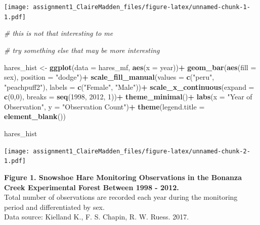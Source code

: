 \documentclass[]{article}
\newenvironment{Shaded}{\begin{snugshade}}{\end{snugshade}}
\newcommand{\KeywordTok}[1]{\textcolor[rgb]{0.13,0.29,0.53}{\textbf{#1}}}
\newcommand{\DataTypeTok}[1]{\textcolor[rgb]{0.13,0.29,0.53}{#1}}
\newcommand{\DecValTok}[1]{\textcolor[rgb]{0.00,0.00,0.81}{#1}}
\newcommand{\StringTok}[1]{\textcolor[rgb]{0.31,0.60,0.02}{#1}}
\newcommand{\CommentTok}[1]{\textcolor[rgb]{0.56,0.35,0.01}{\textit{#1}}}
\newcommand{\OperatorTok}[1]{\textcolor[rgb]{0.81,0.36,0.00}{\textbf{#1}}}
\newcommand{\NormalTok}[1]{#1}
\begin{document}
\texttt{[image: assignment1\_ClaireMadden\_files/figure-latex/unnamed-chunk-1-1.pdf]}

\begin{Shaded}
\begin{Highlighting}[]
\CommentTok{# this is not that interesting to me}
\end{Highlighting}
\end{Shaded}

\begin{Shaded}
\begin{Highlighting}[]
\CommentTok{# try something else that may be more interesting}

\NormalTok{hares_hist <-}\StringTok{ }\KeywordTok{ggplot}\NormalTok{(}\DataTypeTok{data =}\NormalTok{ hares_mf, }\KeywordTok{aes}\NormalTok{(}\DataTypeTok{x =}\NormalTok{ year))}\OperatorTok{+}
\StringTok{  }\KeywordTok{geom_bar}\NormalTok{(}\KeywordTok{aes}\NormalTok{(}\DataTypeTok{fill =}\NormalTok{ sex), }\DataTypeTok{position =} \StringTok{"dodge"}\NormalTok{)}\OperatorTok{+}
\StringTok{  }\KeywordTok{scale_fill_manual}\NormalTok{(}\DataTypeTok{values =} \KeywordTok{c}\NormalTok{(}\StringTok{"peru"}\NormalTok{, }\StringTok{"peachpuff2"}\NormalTok{), }\DataTypeTok{labels =} \KeywordTok{c}\NormalTok{(}\StringTok{"Female"}\NormalTok{, }\StringTok{"Male"}\NormalTok{))}\OperatorTok{+}
\StringTok{  }\KeywordTok{scale_x_continuous}\NormalTok{(}\DataTypeTok{expand =} \KeywordTok{c}\NormalTok{(}\DecValTok{0}\NormalTok{,}\DecValTok{0}\NormalTok{),}
                     \DataTypeTok{breaks =} \KeywordTok{seq}\NormalTok{(}\DecValTok{1998}\NormalTok{, }\DecValTok{2012}\NormalTok{, }\DecValTok{1}\NormalTok{))}\OperatorTok{+}
\StringTok{  }\KeywordTok{theme_minimal}\NormalTok{()}\OperatorTok{+}
\StringTok{  }\KeywordTok{labs}\NormalTok{(}\DataTypeTok{x =} \StringTok{"Year of Observation"}\NormalTok{,}
       \DataTypeTok{y =} \StringTok{"Observation Count"}\NormalTok{)}\OperatorTok{+}
\StringTok{  }\KeywordTok{theme}\NormalTok{(}\DataTypeTok{legend.title =} \KeywordTok{element_blank}\NormalTok{())}
  


\NormalTok{hares_hist}
\end{Highlighting}
\end{Shaded}

\texttt{[image: assignment1\_ClaireMadden\_files/figure-latex/unnamed-chunk-2-1.pdf]}

\textbf{Figure 1. Snowshoe Hare Monitoring Observations in the Bonanza
Creek Experimental Forest Between 1998 - 2012.}\\
Total number of observations are recorded each year during the
monitoring period and differentiated by sex.\\
Data source: Kielland K., F. S. Chapin, R. W. Ruess. 2017.
\end{document}

